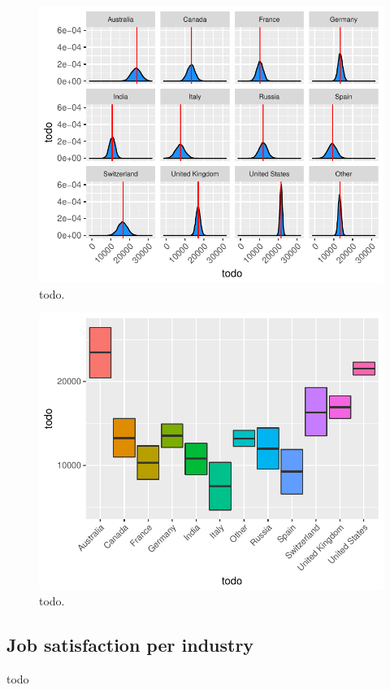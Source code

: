 \documentclass{article}
\begin{document}
\begin{figure}[H]
\centering
\includegraphics{report-027}
\caption{todo.}\label{fig_7}
\end{figure}


\begin{figure}[H]
\centering
\includegraphics{report-029}
\caption{todo.}\label{fig_8}
\end{figure}

\subsection{Job satisfaction per industry}
todo
\end{document}
